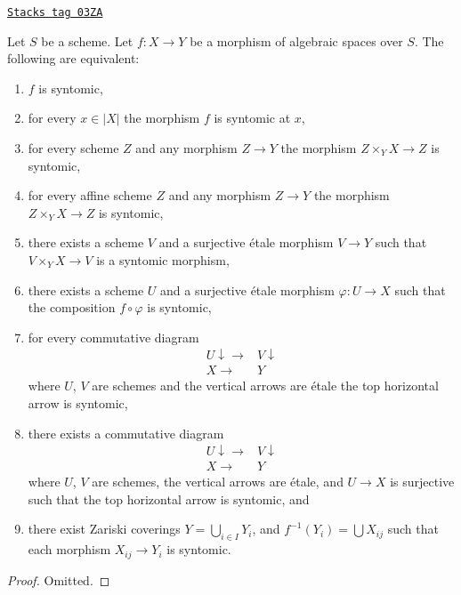 \begin{lemma}
\label{spaces-morphisms-lemma-syntomic-local}
\href{https://stacks.math.columbia.edu/tag/03ZA}{\texttt{Stacks tag 03ZA}}

Let $S$ be a scheme.
Let $f : X \to Y$ be a morphism of algebraic spaces over $S$.
The following are equivalent:
\begin{enumerate}
\item $f$ is syntomic,
\item for every $x \in |X|$ the morphism $f$ is syntomic at $x$,
\item for every scheme $Z$ and any morphism $Z \to Y$ the morphism
$Z \times_Y X \to Z$ is syntomic,
\item for every affine scheme $Z$ and any morphism
$Z \to Y$ the morphism $Z \times_Y X \to Z$ is syntomic,
\item there exists a scheme $V$ and a surjective \'etale morphism
$V \to Y$ such that $V \times_Y X \to V$ is a syntomic morphism,
\item there exists a scheme $U$ and a surjective \'etale morphism
$\varphi : U \to X$ such that the composition $f \circ \varphi$
is syntomic,
\item for every commutative diagram
$$
\begin{array}{cc}U \downarrow\longrightarrow & V \downarrow \\ X \longrightarrow & Y\end{array}
$$
where $U$, $V$ are schemes and the vertical arrows are \'etale
the top horizontal arrow is syntomic,
\item there exists a commutative diagram
$$
\begin{array}{cc}U \downarrow\longrightarrow & V \downarrow \\ X \longrightarrow & Y\end{array}
$$
where $U$, $V$ are schemes, the vertical arrows are \'etale, and
$U \to X$ is surjective such that the top horizontal arrow is syntomic, and
\item there exist Zariski coverings $Y = \bigcup_{i \in I} Y_i$,
and $f^{-1}(Y_i) = \bigcup X_{ij}$ such that
each morphism $X_{ij} \to Y_i$ is syntomic.
\end{enumerate}
\end{lemma}

\begin{proof}
Omitted.
\end{proof}

